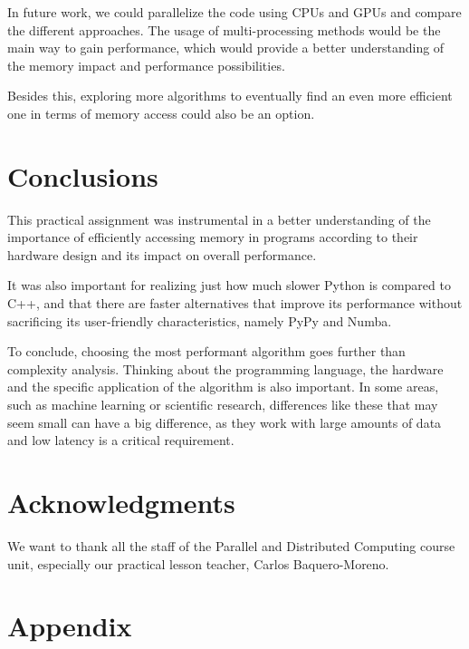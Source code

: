 \documentclass[sigconf,balance,nonacm]{acmart}
\begin{document}
In future work, we could parallelize the code using CPUs and GPUs and compare the different approaches.
The usage of multi-processing methods would be the main way to gain performance, which would provide a better understanding of the memory impact and performance possibilities.

Besides this, exploring more algorithms to eventually find an even more efficient one in terms of memory access could also be an option.

\section{Conclusions}
\label{sec:conclusions}

This practical assignment was instrumental in a better understanding of the importance of efficiently accessing memory in programs according to their hardware design and its impact on overall performance.

It was also important for realizing just how much slower Python is compared to C++, and that there are faster alternatives that improve its performance without sacrificing its user-friendly characteristics, namely PyPy and Numba.

To conclude, choosing the most performant algorithm goes further than complexity analysis.
Thinking about the programming language, the hardware and the specific application of the algorithm is also important.
In some areas, such as machine learning or scientific research, differences like these that may seem small can have a big difference, as they work with large amounts of data and low latency is a critical requirement.

\section*{Acknowledgments}

We want to thank all the staff of the Parallel and Distributed Computing course unit, especially our practical lesson teacher, Carlos Baquero-Moreno.

\onecolumn
\appendix
\section{Appendix}
\label{appendix}
\end{document}

